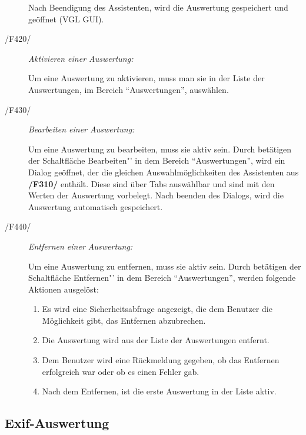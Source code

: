 \begin{description}
\begin{enumerate}
			\end{enumerate}

			Nach Beendigung des Assistenten, wird die Auswertung gespeichert und geöffnet (VGL GUI).
		
		\item[/F420/] \textit{Aktivieren einer Auswertung:}\par Um eine Auswertung zu aktivieren, muss man sie in der Liste der Auswertungen, im Bereich "`Auswertungen"', auswählen.
		
		\item[/F430/] \textit{Bearbeiten einer Auswertung:}\par Um eine Auswertung zu bearbeiten, muss sie aktiv sein. Durch betätigen der Schaltfläche Bearbeiten"' in dem Bereich "`Auswertungen"', wird ein Dialog geöffnet, der die gleichen Auswahlmöglichkeiten des Assistenten aus \textbf{/F310/} enthält. Diese sind über Tabs auswählbar und sind mit den Werten der Auswertung vorbelegt. Nach beenden des Dialogs, wird die Auswertung automatisch gespeichert.
				
		\item[/F440/] \textit{Entfernen einer Auswertung:}\par Um eine Auswertung zu entfernen, muss sie aktiv sein. Durch betätigen der Schaltfläche Entfernen"' in dem Bereich "`Auswertungen"', werden folgende Aktionen ausgelöst:

			\begin{enumerate}

				\item Es wird eine Sicherheitsabfrage angezeigt, die dem Benutzer die Möglichkeit gibt, das Entfernen abzubrechen.

				\item Die Auswertung wird aus der Liste der Auswertungen entfernt.

				\item Dem Benutzer wird eine Rückmeldung gegeben, ob das Entfernen erfolgreich war oder ob es einen Fehler gab.

				\item Nach dem Entfernen, ist die erste Auswertung in der Liste aktiv.

			\end{enumerate}
			
	\end{description}

\subsection{Exif-Auswertung}

